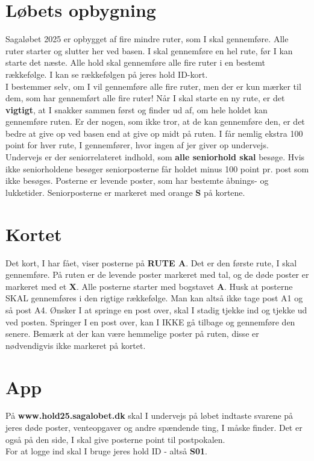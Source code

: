 \section{Løbets opbygning}
Sagaløbet 2025 er opbygget af fire mindre ruter, som I skal gennemføre. Alle ruter starter og slutter her ved basen. I skal gennemføre en hel rute, før I kan starte det næste. Alle hold skal gennemføre alle fire ruter i en bestemt rækkefølge. I kan se rækkefølgen på jeres hold ID-kort.\\\newline
I bestemmer selv, om I vil gennemføre alle fire ruter, men der er kun mærker til dem, som har gennemført alle fire ruter! Når I skal starte en ny rute, er det \textbf{vigtigt}, at I snakker sammen først og finder ud af, om hele holdet kan gennemføre ruten. Er der nogen, som ikke tror, at de kan gennemføre den, er det bedre at give op ved basen end at give op midt på ruten. I får nemlig ekstra 100 point for hver rute, I gennemfører, hvor ingen af jer giver op undervejs.\\
\newline
Undervejs er der seniorrelateret indhold, som \textbf{alle seniorhold skal} besøge. Hvis ikke seniorholdene besøger seniorposterne får holdet minus 100 point pr. post som ikke besøges. Posterne er levende poster, som har bestemte åbnings- og lukketider. Seniorposterne er markeret med orange \textbf{S} på kortene.\\
\newline
\section{Kortet}
Det kort, I har fået, viser posterne på \textbf{RUTE A}. Det er den første rute, I skal gennemføre. På ruten er de levende poster markeret med tal, og de døde poster er markeret med et \textbf{X}. Alle posterne starter med bogstavet \textbf{A}. Husk at posterne SKAL gennemføres i den rigtige rækkefølge. Man kan altså ikke tage post A1 og så post A4. Ønsker I at springe en post over, skal I stadig tjekke ind og tjekke ud ved posten. Springer I en post over, kan I IKKE gå tilbage og gennemføre den senere. Bemærk at der kan være hemmelige poster på ruten, disse er nødvendigvis ikke markeret på kortet.
\section{App}
På \textbf{www.hold25.sagalobet.dk} skal I undervejs på løbet indtaste svarene på jeres døde poster, venteopgaver og andre spændende ting, I måske finder. Det er også på den side, I skal give posterne point til postpokalen.\\
For at logge ind skal I bruge jeres hold ID - altså \textbf{S01}.
\newpage
